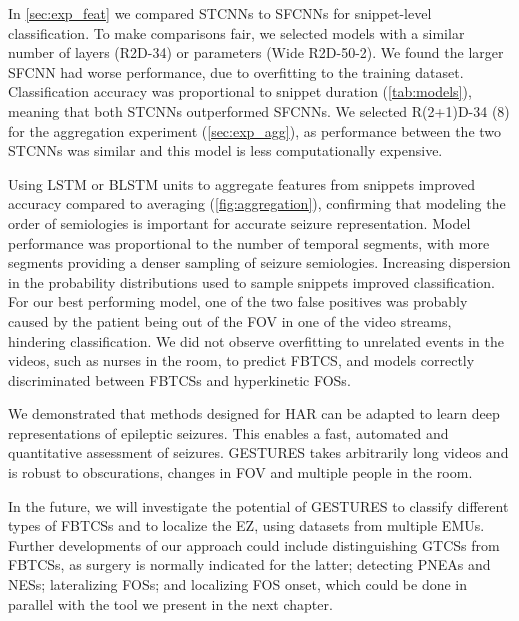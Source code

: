 In \cref{sec:exp_feat} we compared \acp{STCNN} to \acp{SFCNN} for snippet-level classification.
To make comparisons fair, we selected models with a similar number of layers (R2D-34) or parameters (Wide R2D-50-2).
We found the larger \ac{SFCNN} had worse performance, due to overfitting to the training dataset.
Classification accuracy was proportional to snippet duration (\cref{tab:models}), meaning that both \acp{STCNN} outperformed \acp{SFCNN}.
We selected R(2+1)D-34 (8) for the aggregation experiment (\cref{sec:exp_agg}), as performance between the two \acp{STCNN} was similar and this model is less computationally expensive.

Using \ac{LSTM} or \ac{BLSTM} units to aggregate features from snippets improved accuracy compared to averaging (\cref{fig:aggregation}), confirming that modeling the order of semiologies is important for accurate seizure representation.
Model performance was proportional to the number of temporal segments, with more segments providing a denser sampling of seizure semiologies. %
Increasing dispersion in the probability distributions used to sample snippets improved classification.
For our best performing model, one of the two false positives was probably caused by the patient being out of the \ac{FOV} in one of the video streams, hindering classification.
We did not observe overfitting to unrelated events in the videos, such as nurses in the room, to predict \ac{FBTCS}, and models correctly discriminated between \acp{FBTCS} and hyperkinetic \acp{FOS}.

We demonstrated that methods designed for \ac{HAR} can be adapted to learn deep representations of epileptic seizures.
This enables a fast, automated and quantitative assessment of seizures.
\Ac{GESTURES} takes arbitrarily long videos and is robust to obscurations, changes in \ac{FOV} and multiple people in the room.

In the future, we will investigate the potential of \ac{GESTURES} to classify different types of \acp{FBTCS} and to localize the \ac{EZ}, using datasets from multiple \acp{EMU}.
Further developments of our approach could include
distinguishing \acp{GTCS} from \acp{FBTCS}, as surgery is normally indicated for the latter;
detecting \acp{PNEA} and \acp{NES};
lateralizing \acp{FOS};
and localizing \ac{FOS} onset, which could be done in parallel with the tool we present in the next chapter.
